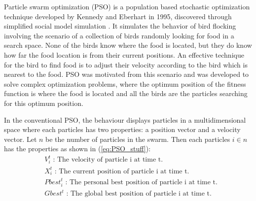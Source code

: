 \documentclass{pdfmx4020}
\begin{document}

    Particle swarm optimization (PSO) is a population based  stochastic optimization technique developed by Kennedy and  Eberhart in 1995, discovered through simplified social model simulation \cite{pso,pso2,pso3,pso4}. It simulates the behavior of bird flocking involving the scenario of a collection of birds randomly looking for food in a search space. None of the birds know where the food is located, but they do know how far the food location is from their current positions. An effective technique for the bird to find food is to adjust their velocity according to the bird which is nearest to the food. PSO was motivated from this scenario and was developed to solve complex optimization problems, where the optimum position of the fitness function is where the food is located and all the birds are the particles searching for this optimum position. 

    In the conventional PSO, the behaviour displays particles in a multidimensional space where each particles has two properties: a position vector and a velocity vector. Let $n$ be the number of particles in the swarm.  Then each particles $i \in n$ has the properties as shown in (\ref{eq:PSO_stuff}):
    \begin{equation} \label{eq:PSO_stuff}
      \begin{split}
        & V_i^t \text{ : The velocity of particle i at time t.} \\
        & X_i^t \text{ : The current position of particle i at time t.} \\
        & Pbest_i^t \text{ : The personal best position of particle i at time t.} \\
        & Gbest^t \text{ : The global best position of particle i at time t.} \\
      \end{split}
    \end{equation}
\end{document}
